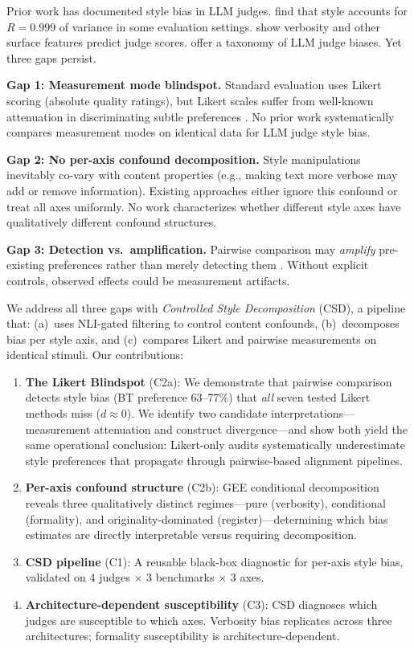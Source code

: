 \documentclass[11pt,a4paper]{article}
\newcommand{\csd}{\textsc{CSD}}
\begin{document}
Prior work has documented style bias in LLM judges. \citet{wu2023style} find that style accounts for $R = 0.999$ of variance in some evaluation settings. \citet{park2024disentangling} show verbosity and other surface features predict judge scores. \citet{stureborg2024large} offer a taxonomy of LLM judge biases.  Yet three gaps persist.

\textbf{Gap 1: Measurement mode blindspot.} Standard evaluation uses Likert scoring (absolute quality ratings), but Likert scales suffer from well-known attenuation in discriminating subtle preferences \citep{thurstone1927law,stevens1946theory}. No prior work systematically compares measurement modes on identical data for LLM judge style bias.

\textbf{Gap 2: No per-axis confound decomposition.} Style manipulations inevitably co-vary with content properties (e.g., making text more verbose may add or remove information). Existing approaches either ignore this confound \citep{wu2023style,park2024disentangling} or treat all axes uniformly. No work characterizes whether different style axes have qualitatively different confound structures.

\textbf{Gap 3: Detection vs.\ amplification.} Pairwise comparison may \emph{amplify} pre-existing preferences rather than merely detecting them \citep{jeong2025comparative}. Without explicit controls, observed effects could be measurement artifacts.

We address all three gaps with \emph{Controlled Style Decomposition} (\csd{}), a pipeline that: (a)~uses NLI-gated filtering to control content confounds, (b)~decomposes bias per style axis, and (c)~compares Likert and pairwise measurements on identical stimuli. Our contributions:

\begin{enumerate}
    \item \textbf{The Likert Blindspot} (C2a): We demonstrate that pairwise comparison detects style bias (BT preference 63--77\%) that \emph{all} seven tested Likert methods miss ($d \approx 0$). We identify two candidate interpretations---measurement attenuation and construct divergence---and show both yield the same operational conclusion: Likert-only audits systematically underestimate style preferences that propagate through pairwise-based alignment pipelines.
    \item \textbf{Per-axis confound structure} (C2b): GEE conditional decomposition reveals three qualitatively distinct regimes---pure (verbosity), conditional (formality), and originality-dominated (register)---determining which bias estimates are directly interpretable versus requiring decomposition.
    \item \textbf{CSD pipeline} (C1): A reusable black-box diagnostic for per-axis style bias, validated on 4 judges $\times$ 3 benchmarks $\times$ 3 axes.
    \item \textbf{Architecture-dependent susceptibility} (C3): CSD diagnoses which judges are susceptible to which axes. Verbosity bias replicates across three architectures; formality susceptibility is architecture-dependent.
\end{enumerate}
\end{document}
